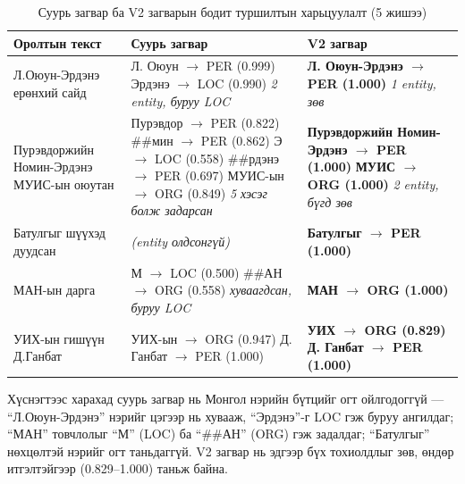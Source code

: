 \begin{table}[h!]
\centering
\renewcommand{\arraystretch}{1.3}
\small
\begin{tabular}{|p{3.5cm}|p{4.5cm}|p{5.5cm}|}
\hline
\textbf{Оролтын текст} & \textbf{Суурь загвар} & \textbf{V2 загвар} \\ \hline
Л.Оюун-Эрдэнэ ерөнхий сайд &
  Л. Оюун $\rightarrow$ PER (0.999) \newline Эрдэнэ $\rightarrow$ LOC (0.990) \newline \textit{2 entity, буруу LOC} &
  \textbf{Л. Оюун-Эрдэнэ $\rightarrow$ PER (1.000)} \newline \textit{1 entity, зөв} \\ \hline
Пурэвдоржийн Номин-Эрдэнэ МУИС-ын оюутан &
  Пурэвдор $\rightarrow$ PER (0.822) \newline \#\#мин $\rightarrow$ PER (0.862) \newline Э $\rightarrow$ LOC (0.558) \newline \#\#рдэнэ $\rightarrow$ PER (0.697) \newline МУИС-ын $\rightarrow$ ORG (0.849) \newline \textit{5 хэсэг болж задарсан} &
  \textbf{Пурэвдоржийн Номин-Эрдэнэ $\rightarrow$ PER (1.000)} \newline \textbf{МУИС $\rightarrow$ ORG (1.000)} \newline \textit{2 entity, бүгд зөв} \\ \hline
Батулгыг шүүхэд дуудсан &
  \textit{(entity олдсонгүй)} &
  \textbf{Батулгыг $\rightarrow$ PER (1.000)} \\ \hline
МАН-ын дарга &
  М $\rightarrow$ LOC (0.500) \newline \#\#АН $\rightarrow$ ORG (0.558) \newline \textit{хуваагдсан, буруу LOC} &
  \textbf{МАН $\rightarrow$ ORG (1.000)} \\ \hline
УИХ-ын гишүүн Д.Ганбат &
  УИХ-ын $\rightarrow$ ORG (0.947) \newline Д. Ганбат $\rightarrow$ PER (1.000) &
  \textbf{УИХ $\rightarrow$ ORG (0.829)} \newline \textbf{Д. Ганбат $\rightarrow$ PER (1.000)} \\ \hline
\end{tabular}
\caption{Суурь загвар ба V2 загварын бодит туршилтын харьцуулалт (5 жишээ)}
\label{tab:test_comparison}
\normalsize
\end{table}

Хүснэгтээс харахад суурь загвар нь Монгол нэрийн бүтцийг огт ойлгодоггүй --- ``Л.Оюун-Эрдэнэ'' нэрийг цэгээр нь хувааж, ``Эрдэнэ''-г LOC гэж буруу ангилдаг; ``МАН'' товчлолыг ``М'' (LOC) ба ``\#\#АН'' (ORG) гэж задалдаг; ``Батулгыг'' нөхцөлтэй нэрийг огт таньдаггүй. V2 загвар нь эдгээр бүх тохиолдлыг зөв, өндөр итгэлтэйгээр (0.829--1.000) таньж байна.

